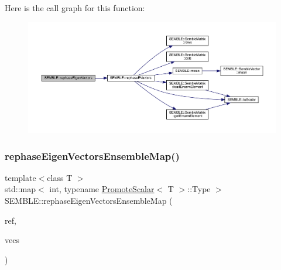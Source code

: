 Here is the call graph for this function\+:
\nopagebreak
\begin{figure}[H]
\begin{center}
\leavevmode
\includegraphics[width=350pt]{d7/dfd/namespaceSEMBLE_ab6128a994eb0c94caa8452dfd476553f_cgraph}
\end{center}
\end{figure}
\mbox{\label{namespaceSEMBLE_aec7678ee7a5da493a6b088df20493a1f}} 
\subsubsection{\texorpdfstring{rephaseEigenVectorsEnsembleMap()}{rephaseEigenVectorsEnsembleMap()}}
{\footnotesize\ttfamily template$<$class T $>$ \\
std\+::map$<$ int, typename \mbox{\hyperlink{structSEMBLE_1_1PromoteScalar}{Promote\+Scalar}}$<$ T $>$\+::Type $>$ S\+E\+M\+B\+L\+E\+::rephase\+Eigen\+Vectors\+Ensemble\+Map (\begin{DoxyParamCaption}\item[{const \mbox{\hyperlink{structSEMBLE_1_1SembleMatrix}{Semble\+Matrix}}$<$ T $>$ \&}]{ref,  }\item[{const \mbox{\hyperlink{structSEMBLE_1_1SembleMatrix}{Semble\+Matrix}}$<$ T $>$ \&}]{vecs }\end{DoxyParamCaption})}

